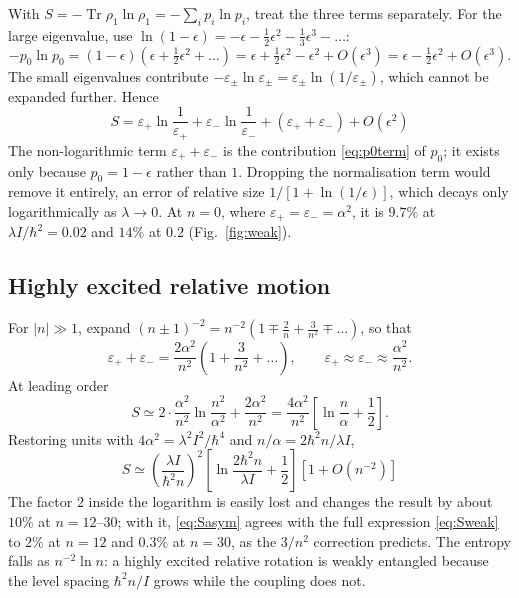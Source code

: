 \documentclass[preprint,12pt]{elsarticle}
\newcommand{\Tr}{\operatorname{Tr}}
\newcommand{\epsp}{\varepsilon_{+}}
\newcommand{\epsm}{\varepsilon_{-}}
\begin{document}
With $S=-\Tr\rho_{1}\ln\rho_{1}=-\sum_{i}p_{i}\ln p_{i}$, treat the three terms
separately. For the large eigenvalue, use
$\ln(1-\epsilon)=-\epsilon-\tfrac12\epsilon^{2}-\tfrac13\epsilon^{3}-\dots$:
\begin{equation}
-p_{0}\ln p_{0}=(1-\epsilon)\left(\epsilon+\tfrac12\epsilon^{2}+\dots\right)
=\epsilon+\tfrac12\epsilon^{2}-\epsilon^{2}+O(\epsilon^{3})
=\epsilon-\tfrac12\epsilon^{2}+O(\epsilon^{3}).
\label{eq:p0term}
\end{equation}
The small eigenvalues contribute $-\varepsilon_{\pm}\ln\varepsilon_{\pm}
=\varepsilon_{\pm}\ln(1/\varepsilon_{\pm})$, which cannot be expanded further.
Hence
\begin{equation}
\boxed{\;
S=\epsp\ln\frac{1}{\epsp}+\epsm\ln\frac{1}{\epsm}+\left(\epsp+\epsm\right)
+O(\epsilon^{2})\;}
\label{eq:Sweak}
\end{equation}
The non-logarithmic term $\epsp+\epsm$ is the contribution
\eqref{eq:p0term} of $p_{0}$; it exists only because $p_{0}=1-\epsilon$ rather
than $1$. Dropping the normalisation term would remove it entirely, an error of
relative size $1/[1+\ln(1/\epsilon)]$, which decays only logarithmically as
$\lambda\to0$. At $n=0$, where $\epsp=\epsm=\alpha^{2}$, it is $9.7\%$ at
$\lambda I/\hbar^{2}=0.02$ and $14\%$ at $0.2$ (Fig.~\ref{fig:weak}).

\subsection{Highly excited relative motion}

For $|n|\gg1$, expand
$(n\pm1)^{-2}=n^{-2}\left(1\mp\tfrac2n+\tfrac3{n^{2}}\mp\dots\right)$, so that
\begin{equation}
\epsp+\epsm=\frac{2\alpha^{2}}{n^{2}}\left(1+\frac{3}{n^{2}}+\dots\right),
\qquad \epsp\approx\epsm\approx\frac{\alpha^{2}}{n^{2}} .
\end{equation}
At leading order
\begin{equation}
S\simeq2\cdot\frac{\alpha^{2}}{n^{2}}\ln\frac{n^{2}}{\alpha^{2}}
+\frac{2\alpha^{2}}{n^{2}}
=\frac{4\alpha^{2}}{n^{2}}\left[\ln\frac{n}{\alpha}+\frac12\right].
\end{equation}
Restoring units with $4\alpha^{2}=\lambda^{2}I^{2}/\hbar^{4}$ and
$n/\alpha=2\hbar^{2}n/\lambda I$,
\begin{equation}
\boxed{\;
S\simeq\left(\frac{\lambda I}{\hbar^{2}n}\right)^{2}
\left[\ln\frac{2\hbar^{2}n}{\lambda I}+\frac12\right]
\left[1+O(n^{-2})\right]\;}
\label{eq:Sasym}
\end{equation}
The factor $2$ inside the logarithm is easily lost and changes the result by
about $10\%$ at $n=12$--$30$; with it, \eqref{eq:Sasym} agrees with the full
expression \eqref{eq:Sweak} to $2\%$ at $n=12$ and $0.3\%$ at $n=30$, as the
$3/n^{2}$ correction predicts. The entropy falls as $n^{-2}\ln n$: a highly
excited relative rotation is weakly entangled because the level spacing
$\hbar^{2}n/I$ grows while the coupling does not.
\end{document}

